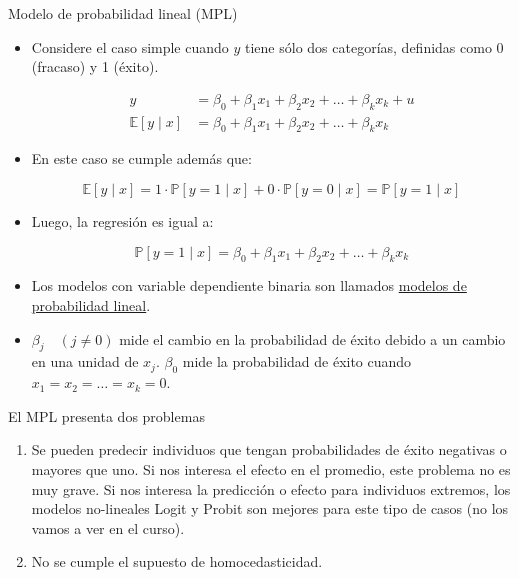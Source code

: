 \documentclass{beamer}
\begin{document}
\begin{frame}{Modelo de probabilidad lineal (MPL)}

{\footnotesize
    \begin{itemize}
    \item Considere el caso simple cuando $y$ tiene sólo dos categorías, definidas como 0 (fracaso) y 1 (éxito).
    
    \begin{align*}
    y &= \beta_0 + \beta_1 x_1 + \beta_2 x_2 + \dots + \beta_k x_k + u \\
    \mathbb{E}[y \mid x] &= \beta_0 + \beta_1 x_1 + \beta_2 x_2 + \dots + \beta_k x_k
    \end{align*}
    
    \item En este caso se cumple además que:
    
    \[
    \mathbb{E}[y \mid x] = 1 \cdot \mathbb{P}[y = 1 \mid x] + 0 \cdot \mathbb{P}[y = 0 \mid x] = \mathbb{P}[y = 1 \mid x]
    \]
    
    \item Luego, la regresión es igual a:
    
    \[
    \mathbb{P}[y = 1 \mid x] = \beta_0 + \beta_1 x_1 + \beta_2 x_2 + \dots + \beta_k x_k
    \]
    
    \item Los modelos con variable dependiente binaria son llamados \underline{modelos de probabilidad lineal}.
    
    \item $\beta_j \quad (j\neq 0)$ mide el cambio en la probabilidad de éxito debido a un cambio en una unidad de $x_j$.
    $\beta_0$ mide la probabilidad de éxito cuando $x_1 = x_2 = \dots = x_k = 0$.
    
\end{itemize}}
\end{frame}

\begin{frame}{El MPL presenta dos problemas}

\begin{enumerate}
    \item  Se pueden predecir individuos que tengan probabilidades de \'exito negativas o
mayores que uno.
Si nos interesa el efecto en el promedio, este problema no es muy grave.
Si nos interesa la predicción o efecto para individuos extremos, los modelos
no-lineales Logit y Probit son mejores para este tipo de casos (no los vamos a ver
en el curso).
\item No se cumple el supuesto de homocedasticidad.
\end{enumerate}

\end{frame}
\end{document}
